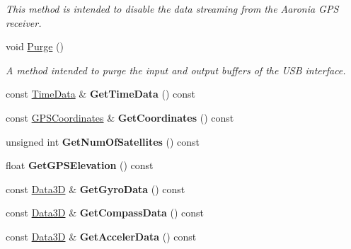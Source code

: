 \begin{DoxyCompactItemize}
\begin{DoxyCompactList}\small\item\em This method is intended to disable the data streaming from the Aaronia G\+PS receiver. \end{DoxyCompactList}\item 
\mbox{\label{classGPSInterface_a698c9b38eaaa36fef1abcbc19614e2ad}} 
void \hyperlink{classGPSInterface_a698c9b38eaaa36fef1abcbc19614e2ad}{Purge} ()
\begin{DoxyCompactList}\small\item\em A method intended to purge the input and output buffers of the U\+SB interface. \end{DoxyCompactList}\item 
\mbox{\label{classGPSInterface_a6ca2cb996a9ed3c6cd436491c56aab18}} 
const \hyperlink{structTimeData}{Time\+Data} \& {\bfseries Get\+Time\+Data} () const
\item 
\mbox{\label{classGPSInterface_a9c827a6ce3078c5e748105019b75e0e0}} 
const \hyperlink{structGPSCoordinates}{G\+P\+S\+Coordinates} \& {\bfseries Get\+Coordinates} () const
\item 
\mbox{\label{classGPSInterface_ab07cafce284ff50540a2be5b00410e34}} 
unsigned int {\bfseries Get\+Num\+Of\+Satellites} () const
\item 
\mbox{\label{classGPSInterface_ac70e16c9a95f440bc8ff58429b0db42a}} 
float {\bfseries Get\+G\+P\+S\+Elevation} () const
\item 
\mbox{\label{classGPSInterface_ac3672cc76506fe6ed1ee4824a57c0857}} 
const \hyperlink{structData3D}{Data3D} \& {\bfseries Get\+Gyro\+Data} () const
\item 
\mbox{\label{classGPSInterface_aa0032f67cd64db9ddeee1b275025b417}} 
const \hyperlink{structData3D}{Data3D} \& {\bfseries Get\+Compass\+Data} () const
\item 
\mbox{\label{classGPSInterface_a675644b668df300d19afaefff9849886}} 
const \hyperlink{structData3D}{Data3D} \& {\bfseries Get\+Acceler\+Data} () const
\item 

\end{DoxyCompactItemize}

